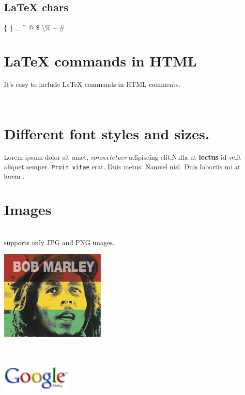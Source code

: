 \documentclass{report}
\begin{document}
 \subsection*{LaTeX chars} \par \{ \} \_ \^{} @ \$ \textbackslash \% \~{} \#
 \section*{LaTeX commands in HTML} \par It's easy to include LaTeX commands in HTML comments. \\ 
 
 \section*{Different font styles and sizes.} \par Lorem ipsum \fontsize{ 36pt}{12pt}\selectfont dolor\normalsize
sit amet, \textit{consectetuer}
adipiscing elit.Nulla ut \textbf{lectus}
id velit aliquet semper.  \texttt{Proin vitae}
erat. Duis metus. Namvel nisl. Duis \small lobortis\normalsize 
mi at \fontsize{ 12pt}{12pt}\selectfont lorem\normalsize
.
{}
 \section*{Images} \par  \\ 
 supports only JPG and PNG images.
\par \begin{center}
\includegraphics[]{marley.jpg}
\end{center}

\par \includegraphics[height=100pt,width=100pt]{logo.png}
\end{document}
